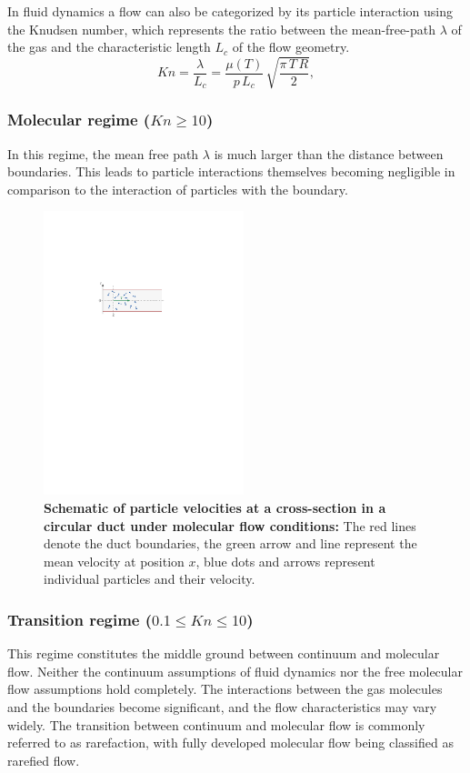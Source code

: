 	In fluid dynamics a flow can also be categorized by its particle interaction using the Knudsen number, which represents the ratio between the mean-free-path $\lambda$ of the gas and the characteristic length $L_c$ of the flow geometry.
	\begin{equation}
		Kn = \frac{\lambda}{L_c}
		= \frac{\mu(T)}{p\,L_c}\,\sqrt{\frac{\pi\,T\,R}{2}},
		\label{eq:knudsen-number}
	\end{equation}

\subsubsection*{Molecular regime ($Kn \geq 10$)}
	In this regime, the mean free path $\lambda$ is much larger than the distance between boundaries.
	This leads to particle interactions themselves becoming negligible in comparison to the interaction of particles with the boundary.
	\begin{figure}[H]
	    \centering
	    \includegraphics[width=0.52\textwidth]{src/02_foundations/fig_molecular-regime.pdf}
		\caption[Schematic of particle velocities at a cross-section in a circular duct under molecular flow conditions.]{
			\textbf{Schematic of particle velocities at a cross-section in a circular duct under molecular flow conditions:}
			The red lines denote the duct boundaries, the green arrow and line represent the mean velocity at position $x$, blue dots and arrows represent individual particles and their velocity.
		}
		\label{fig:molecular-flow}
	\end{figure}

\subsubsection*{Transition regime ($0.1 \leq Kn \leq 10$)}
	This regime constitutes the middle ground between continuum and molecular flow.
	Neither the continuum assumptions of fluid dynamics nor the free molecular flow assumptions hold completely.
	The interactions between the gas molecules and the boundaries become significant, and the flow characteristics may vary widely.
	The transition between continuum and molecular flow is commonly referred to as rarefaction, with fully developed molecular flow being classified as rarefied flow. 

